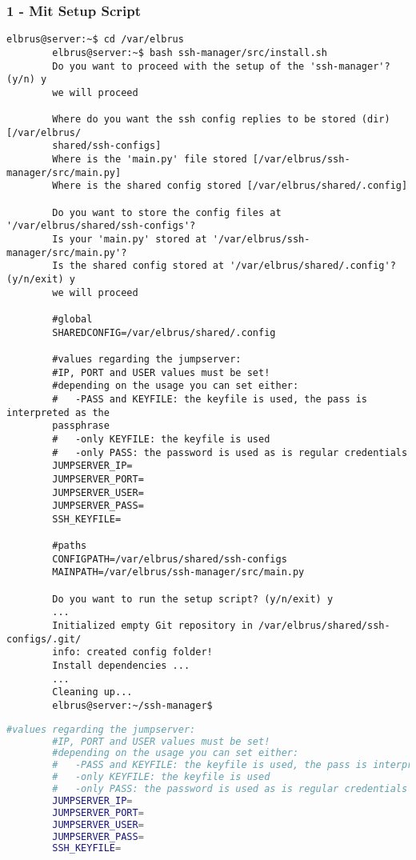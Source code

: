 \documentclass{article}
\begin{document}
	\subsubsection{1 - Mit Setup Script}
	\lstset{style=commands}
	\begin{lstlisting}[caption={Ausführen des 'install.sh' Scripts.}]
		elbrus@server:~$ cd /var/elbrus
		elbrus@server:~$ bash ssh-manager/src/install.sh
		Do you want to proceed with the setup of the 'ssh-manager'? (y/n) y
		we will proceed
		
		Where do you want the ssh config replies to be stored (dir) [/var/elbrus/
		shared/ssh-configs]
		Where is the 'main.py' file stored [/var/elbrus/ssh-manager/src/main.py]
		Where is the shared config stored [/var/elbrus/shared/.config]
		
		Do you want to store the config files at '/var/elbrus/shared/ssh-configs'?
		Is your 'main.py' stored at '/var/elbrus/ssh-manager/src/main.py'?
		Is the shared config stored at '/var/elbrus/shared/.config'? (y/n/exit) y
		we will proceed
		
		#global
		SHAREDCONFIG=/var/elbrus/shared/.config
		
		#values regarding the jumpserver:
		#IP, PORT and USER values must be set!
		#depending on the usage you can set either:
		#   -PASS and KEYFILE: the keyfile is used, the pass is interpreted as the
		passphrase
		#   -only KEYFILE: the keyfile is used
		#   -only PASS: the password is used as is regular credentials
		JUMPSERVER_IP=
		JUMPSERVER_PORT=
		JUMPSERVER_USER=
		JUMPSERVER_PASS=
		SSH_KEYFILE=
		
		#paths
		CONFIGPATH=/var/elbrus/shared/ssh-configs
		MAINPATH=/var/elbrus/ssh-manager/src/main.py
		
		Do you want to run the setup script? (y/n/exit) y
		...
		Initialized empty Git repository in /var/elbrus/shared/ssh-configs/.git/
		info: created config folder!
		Install dependencies ...
		...
		Cleaning up...
		elbrus@server:~/ssh-manager$
	\end{lstlisting}

	\lstset{style=files}
	\begin{lstlisting}[caption={Ergänzen der fehlenden Werten in '.env'.}, language=bash]
		#values regarding the jumpserver:
		#IP, PORT and USER values must be set!
		#depending on the usage you can set either:
		#   -PASS and KEYFILE: the keyfile is used, the pass is interpreted as the passphrase
		#   -only KEYFILE: the keyfile is used
		#   -only PASS: the password is used as is regular credentials
		JUMPSERVER_IP=
		JUMPSERVER_PORT=
		JUMPSERVER_USER=
		JUMPSERVER_PASS=
		SSH_KEYFILE=
	\end{lstlisting}
	
\end{document}
